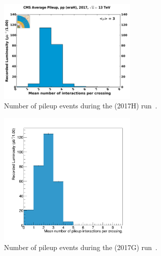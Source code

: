 \begin{figure}[htb]
\centering
  \includegraphics[width=0.6\textwidth]{plots/Data/pileup_pp_lowPU_2017.pdf}
  \caption{Number of pileup events during the \serah (2017H) run~\cite{LumiCalibTwiki}.}
  \label{fig:data:lumiPU13}
\end{figure}

\begin{figure}[htb]
\centering
  \includegraphics[width=0.6\textwidth]{plots/Data/pileup_5TeV.png}
  \caption{Number of pileup events during the \serag (2017G) run~\cite{LumiCalibTwiki}.}
  \label{fig:data:lumiPU5}
\end{figure}